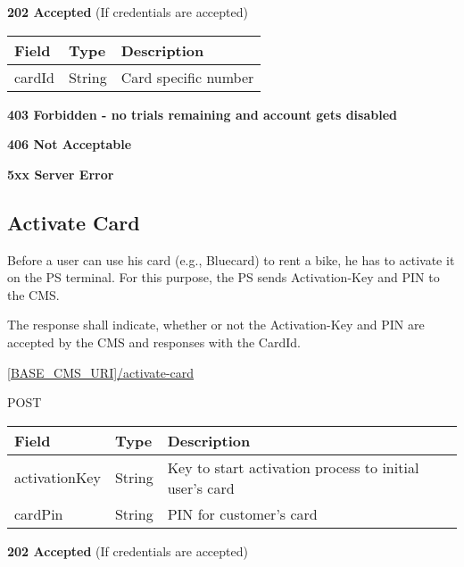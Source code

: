 \textbf{202 Accepted} (If credentials are accepted)

\begin{table}[!h]
\begin{tabularx}{\linewidth}{ | l | l | X | }
  \hline
  \rowcolor{table-head}
  Field & Type & Description \\
  \hline
  	cardId & String 		& Card specific number\\
    \hline
\end{tabularx}
\end{table}

 \textbf{403 Forbidden - no trials remaining and account gets disabled}

\textbf{406 Not Acceptable}

\textbf{5xx Server Error}

\subsection{Activate Card}

Before a user can use his card (e.g., Bluecard) to rent a bike, he has to activate it on the \acs{PS} terminal. For this purpose, the \acs{PS} sends Activation-Key and PIN to the \acs{CMS}.

The response shall indicate, whether or not the Activation-Key and PIN are accepted by the \acs{CMS} and responses with the CardId.

 \url{[BASE_CMS_URI]/activate-card}

 POST

\begin{table}[!h]
\vspace{-7mm}
\begin{tabularx}{\linewidth}{ | l | l | X | }
  \hline
  \rowcolor{table-head}
  Field & Type & Description \\
  \hline
  	activationKey & String & Key to start activation process to initial user's card\\
  	cardPin & String & PIN for customer's card\\
    \hline
\end{tabularx}
\end{table}

\textbf{202 Accepted} (If credentials are accepted)

